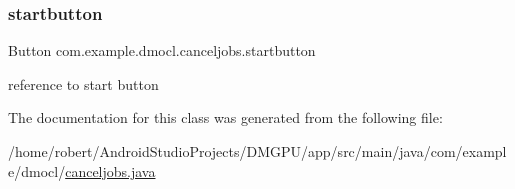 \subsubsection{\texorpdfstring{startbutton}{startbutton}}
{\footnotesize\ttfamily Button com.\+example.\+dmocl.\+canceljobs.\+startbutton\hspace{0.3cm}{\ttfamily [private]}}



reference to start button 



The documentation for this class was generated from the following file\+:\begin{DoxyCompactItemize}
\item 
/home/robert/\+Android\+Studio\+Projects/\+D\+M\+G\+P\+U/app/src/main/java/com/example/dmocl/\mbox{\hyperlink{canceljobs_8java}{canceljobs.\+java}}\end{DoxyCompactItemize}
